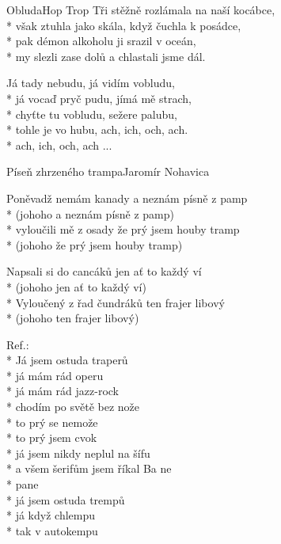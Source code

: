 \documentclass[10.5pt]{book}
\begin{document}
\begin{poem}{Obluda}{Hop Trop}
Tři stěžně rozlámala na naší kocábce,\\*
však ztuhla jako skála, když čuchla k posádce,\\*
pak démon alkoholu ji srazil v oceán,\\*
my slezli zase dolů a chlastali jsme dál.

Já tady nebudu, já vidím vobludu,\\*
já vocaď pryč pudu, jímá mě strach,\\*
chyťte tu vobludu, sežere palubu,\\*
tohle je vo hubu, ach, ich, och, ach.\\*
ach, ich, och, ach ...

\end{poem}

\begin{poem}{Píseň zhrzeného trampa}{Jaromír Nohavica}

\settowidth{\versewidth}{Že prý se můžu vrátit zpět až dám se do cajku}

\begin{altverse}
Poněvadž nemám kanady
a neznám písně z pamp\\*
(johoho a neznám písně z pamp)\\*
vyloučili mě z osady
že prý jsem houby tramp\\*
(johoho že prý jsem houby tramp)
\end{altverse}

\begin{altverse}
Napsali si do cancáků
jen ať to každý ví\\*
(johoho jen ať to každý ví)\\*
Vyloučený z řad čundráků
ten frajer libový\\*
(johoho ten frajer libový)
\end{altverse}

Ref.:\\*
Já jsem ostuda traperů\\*
já mám rád operu\\*
já mám rád jazz-rock\\*
chodím po světě bez nože\\*
to prý se nemože\\*
to prý jsem cvok\\*
já jsem nikdy neplul na šífu\\*
a všem šerifům jsem říkal Ba ne\\*
pane\\*
já jsem ostuda trempů\\*
já když chlempu\\*
tak v autokempu


\end{poem}
\end{document}
